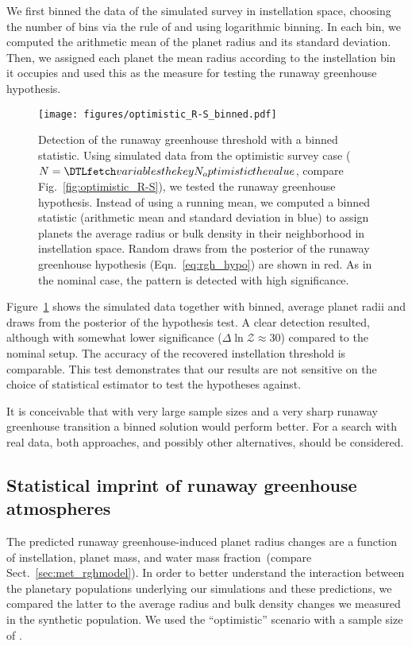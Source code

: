 \documentclass[twocolumn,twocolappendix]{aastex631}
\begin{document}
We first binned the data of the simulated survey in instellation space, choosing the number of bins via the rule of \citet{Freedman1981} and using logarithmic binning.
In each bin, we computed the arithmetic mean of the planet radius and its standard deviation.
Then, we assigned each planet the mean radius according to the instellation bin it occupies and used this as the measure for testing the runaway greenhouse hypothesis.

\begin{figure}[ht!]
    \begin{centering}
        \texttt{[image: figures/optimistic\_R-S\_binned.pdf]}
        \caption{
            Detection of the runaway greenhouse threshold with a binned statistic.
            Using simulated data from the optimistic survey case ($N = \var{N_optimistic}$, compare Fig.~\ref{fig:optimistic_R-S}), we tested the runaway greenhouse hypothesis. Instead of using a running mean, we computed a binned statistic (arithmetic mean and standard deviation in blue) to assign planets the average radius or bulk density in their neighborhood in instellation space. Random draws from the posterior of the runaway greenhouse hypothesis (Eqn.~\ref{eq:rgh_hypo}) are shown in red.
            As in the nominal case, the pattern is detected with high significance.
        }
        \label{fig:optimistic_R-S_binned}
    \end{centering}
\end{figure}
Figure~\ref{fig:optimistic_R-S_binned} shows the simulated data together with binned, average planet radii and draws from the posterior of the hypothesis test.
A clear detection resulted, although with somewhat lower significance ($\Delta \ln \mathcal{Z} \approx 30$) compared to the nominal setup.
The accuracy of the recovered instellation threshold is comparable.
This test demonstrates that our results are not sensitive on the choice of statistical estimator to test the hypotheses against.

It is conceivable that with very large sample sizes and a very sharp runaway greenhouse transition a binned solution would perform better.
For a search with real data, both approaches, and possibly other alternatives, should be considered.

\subsection{Statistical imprint of runaway greenhouse atmospheres}\label{app:model-pop_comparison}
The predicted runaway greenhouse-induced planet radius changes are a function of instellation, planet mass, and water mass fraction~(compare Sect.~\ref{sec:met_rghmodel}).
In order to better understand the interaction between the planetary populations underlying our simulations and these predictions, we compared the latter to the average radius and bulk density changes we measured in the synthetic population.
We used the ``optimistic'' scenario with a sample size of .
\end{document}
